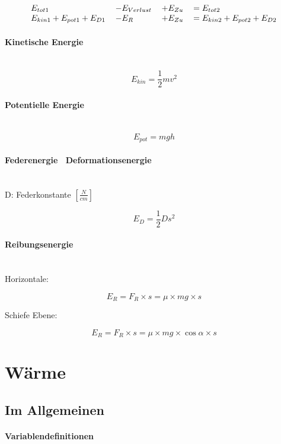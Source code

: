 \documentclass[a4paper,twoside,10pt]{article}
\newcommand{\lbparagraph}[1]{\paragraph{#1}\mbox{}\\}
\begin{document}
\begin{equation}
\begin{tabular}{l l l l}
    $E_{tot1}$ & $- E_{Verlust}$ & $+ E_{Zu}$ & $= E_{tot2}$  \\
    $E_{kin1} + E_{pot1} + E_{D1}$ & $- E_R$ & $+ E_{Zu}$ & $= E_{kin2} + E_{pot2} + E_{D2}$
\end{tabular}
\end{equation}

\lbparagraph{Kinetische Energie}

\begin{equation}
    E_{kin} = \frac{1}{2}mv^2
\end{equation}

\lbparagraph{Potentielle Energie}

\begin{equation}
    E_{pot} = mgh
\end{equation}

\lbparagraph{Federenergie \ Deformationsenergie}

D: Federkonstante $[\frac{N}{cm}]$

\begin{equation}
    E_D = \frac{1}{2}Ds^2
\end{equation}

\lbparagraph{Reibungsenergie}

Horizontale:

\begin{equation}
    E_R = F_R \times s = \mu \times mg \times s
\end{equation}

Schiefe Ebene:

\begin{equation}
    E_R = F_R \times s = \mu \times mg \times \cos{\alpha} \times s
\end{equation}

\section{Wärme}

\subsection{Im Allgemeinen}

\lbparagraph{Variablendefinitionen}
\end{document}
